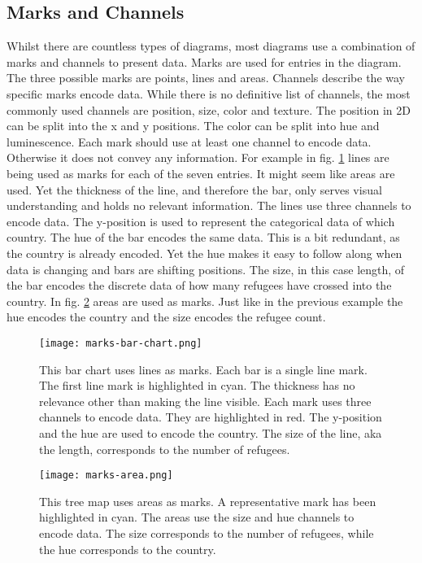 \subsection{Marks and Channels}
Whilst there are countless types of diagrams, most diagrams use a combination of marks and channels to present data. Marks are used for entries in the diagram. The three possible marks are points, lines and areas. Channels describe the way specific marks encode data. While there is no definitive list of channels, the most commonly used channels are position, size, color and texture. The position in 2D can be split into the x and y positions. The color can be split into hue and luminescence. Each mark should use at least one channel to encode data. Otherwise it does not convey any information. For example in fig. \ref{fig:bar-chart} lines are being used as marks for each of the seven entries. It might seem like areas are used. Yet the thickness of the line, and therefore the bar, only serves visual understanding and holds no relevant information. The lines use three channels to encode data. The y-position is used to represent the categorical data of which country. The hue of the bar encodes the same data. This is a bit redundant, as the country is already encoded. Yet the hue makes it easy to follow along when data is changing and bars are shifting positions. The size, in this case length, of the bar encodes the discrete data of how many refugees have crossed into the country. In fig. \ref{fig:marks-area} areas are used as marks. Just like in the previous example the hue encodes the country and the size encodes the refugee count. 

\begin{figure}[ht!]
    \texttt{[image: marks-bar-chart.png]}
    \captionsetup{width=0.9\textwidth}
    \caption[bar-chart]{This bar chart uses lines as marks. Each bar is a single line mark. The first line mark is highlighted in cyan. The thickness has no relevance other than making the line visible. Each mark uses three channels to encode data. They are highlighted in red. The y-position and the hue are used to encode the country. The size of the line, aka the length, corresponds to the number of refugees.}
    \label{fig:bar-chart}
\end{figure}

\begin{figure}[ht!]
    \texttt{[image: marks-area.png]}
    \captionsetup{width=0.9\textwidth}
    \caption[marks-area]{This tree map uses areas as marks. A representative mark has been highlighted in cyan. The areas use the size and hue channels to encode data. The size corresponds to the number of refugees, while the hue corresponds to the country.}
    \label{fig:marks-area}
\end{figure}

